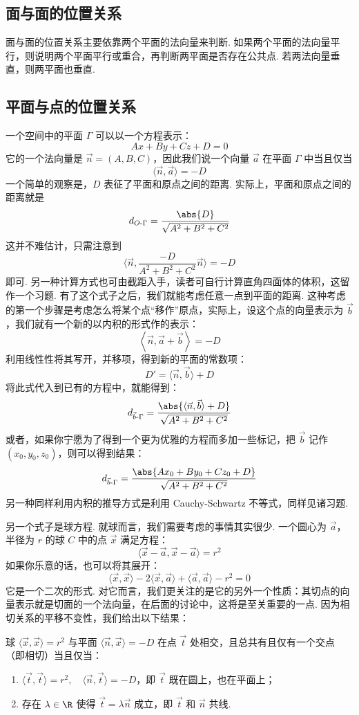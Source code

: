 \subsection{面与面的位置关系}

面与面的位置关系主要依靠两个平面的法向量来判断. 如果两个平面的法向量平行，则说明两个平面平行或重合，再判断两平面是否存在公共点. 若两法向量垂直，则两平面也垂直.

\subsection{平面与点的位置关系}
一个空间中的平面 $\Gamma$ 可以以一个方程表示：
\[
A x + B y + C z + D = 0
\]
它的一个法向量是 $\vec{n} = (A, B, C)$，因此我们说一个向量 $\vec{a}$ 在平面 $\Gamma$ 中当且仅当
\[
\langle \vec{n}, \vec{a} \rangle = -D
\]
一个简单的观察是，$D$ 表征了平面和原点之间的距离. 实际上，平面和原点之间的距离就是
\[
d_{O\text{-}\Gamma} = \frac{\abs{D}}{\sqrt{A^2 + B^2 + C^2}}
\]
这并不难估计，只需注意到
\[
\langle \vec{n}, \frac{-D}{A^2 + B^2 + C^2}\vec{n} \rangle = -D
\]
即可. 另一种计算方式也可由截距入手，读者可自行计算直角四面体的体积，这留作一个习题. 有了这个式子之后，我们就能考虑任意一点到平面的距离. 这种考虑的第一个步骤是考虑怎么将某个点``移作''原点，实际上，设这个点的向量表示为 $\vec{b}$，我们就有一个新的以内积的形式作的表示：
\[
\left\langle \vec{n}, \vec{a} + \vec{b} \right\rangle = -D
\]
利用线性性将其写开，并移项，得到新的平面的常数项：
\[
D' = \langle \vec{n}, \vec{b} \rangle + D
\]
将此式代入到已有的方程中，就能得到：
\[
d_{\vec{b}\text{-}\Gamma} = \frac{\abs{\langle \vec{n}, \vec{b} \rangle + D}}{\sqrt{A^2 + B^2 + C^2}}
\]
或者，如果你宁愿为了得到一个更为优雅的方程而多加一些标记，把 $\vec{b}$ 记作 $(x_0, y_0, z_0)$，则可以得到结果：
\[
d_{\vec{b}\text{-}\Gamma} = \frac{\abs{A x_0 + B y_0 + C z_0 + D}}{\sqrt{A^2 + B^2 + C^2}}
\]
另一种同样利用内积的推导方式是利用 Cauchy-Schwartz 不等式，同样见诸习题.

另一个式子是球方程. 就球而言，我们需要考虑的事情其实很少. 一个圆心为 $\vec{a}$，半径为 $r$ 的球 $C$ 中的点 $\vec{x}$ 满足方程：
\[
\langle \vec{x} - \vec{a}, \vec{x} - \vec{a} \rangle = r^2
\]
如果你乐意的话，也可以将其展开：
\[
\langle \vec{x}, \vec{x} \rangle - 2 \langle \vec{x}, \vec{a} \rangle + \langle \vec{a}, \vec{a} \rangle - r^2 = 0
\]
它是一个二次的形式. 对它而言，我们更关注的是它的另外一个性质：其切点的向量表示就是切面的一个法向量，在后面的讨论中，这将是至关重要的一点. 因为相切关系的平移不变性，我们给出以下结果：

\begin{theorem}{}{}
球 $\langle \vec{x}, \vec{x} \rangle = r^2$ 与平面 $\langle \vec{n}, \vec{x} \rangle = -D$ 在点 $\vec{t}$ 处相交，且总共有且仅有一个交点（即相切）当且仅当：
\begin{enumerate}
    \item $\langle \vec{t}, \vec{t} \rangle = r^2, \quad \langle \vec{n}, \vec{t} \rangle = -D$，即 $\vec{t}$ 既在圆上，也在平面上；
    \item 存在 $\lambda \in \R$ 使得 $\vec{t} = \lambda \vec{n}$ 成立，即 $\vec{t}$ 和 $\vec{n}$ 共线.
\end{enumerate}
\end{theorem}

